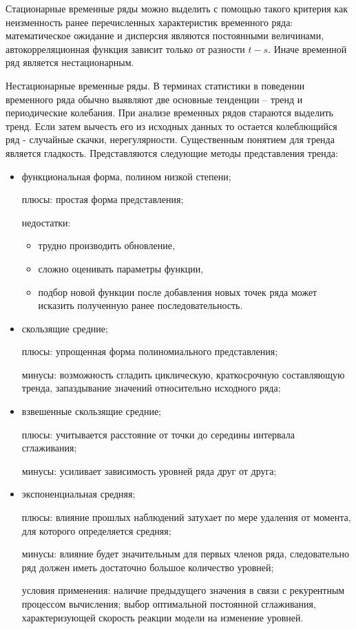 Стационарные временные ряды можно выделить с помощью такого критерия как неизменность ранее перечисленных характеристик временного ряда: математическое ожидание и дисперсия являются постоянными величинами, автокорреляционная функция зависит только от разности $t-s$. Иначе временной ряд является нестационарным.

Нестационарные временные ряды.
В терминах статистики в поведении временного ряда обычно выявляют две основные тенденции -- тренд и периодические колебания. При анализе временных рядов стараются выделить тренд. Если затем вычесть его из исходных данных то остается колеблющийся ряд - случайные скачки, нерегулярности. Существенным понятием для тренда является гладкость.  
Представляются следующие методы представления тренда:
\begin{itemize}
\item функциональная форма, полином низкой степени; 

	плюсы:
	простая форма представления;

	недостатки:
	\begin{itemize}
		\item трудно производить обновление,
		\item сложно оценивать параметры функции,
		\item подбор новой функции после добавления новых точек ряда может исказить полученную ранее последовательность.
	\end{itemize}
\item скользящие средние; 

	плюсы: упрощенная форма полиномиального представления;

	минусы: возможность сгладить циклическую, краткосрочную составляющую тренда, запаздывание значений относительно исходного ряда;

\item взвешенные скользящие средние;

	плюсы: учитывается расстояние от точки до середины интервала сглаживания;

	минусы: усиливает зависимость уровней ряда друг от друга;

\item экспоненциальная средняя;

	плюсы: влияние прошлых наблюдений затухает по мере удаления от момента, для которого определяется средняя;

	минусы: влияние будет значительным для первых членов ряда, следовательно ряд должен иметь достаточно большое количество уровней;

	условия применения: наличие предыдущего значения в связи с рекурентным процессом вычисления;
	выбор оптимальной постоянной сглаживания, характеризующей скорость реакции модели на изменение уровней.

\end{itemize}

